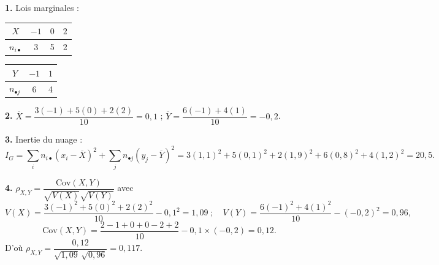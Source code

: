 \documentclass[11pt]{article}
\begin{document}
\textbf{1.} Lois marginales :
\begin{center}\renewcommand{\arraystretch}{1.3}
\begin{tabular}{|c|c|c|c|}\hline $X$ & $-1$ & $0$ & $2$ \\\hline $n_{i\bullet}$ & 3 & 5 & 2 \\\hline\end{tabular}\qquad
\begin{tabular}{|c|c|c|}\hline $Y$ & $-1$ & $1$ \\\hline $n_{\bullet j}$ & 6 & 4 \\\hline\end{tabular}
\end{center}

\textbf{2.} $\overline{X} = \dfrac{3(-1) + 5(0) + 2(2)}{10} = 0{,}1$ ; \quad $\overline{Y} = \dfrac{6(-1) + 4(1)}{10} = -0{,}2$.

\textbf{3.} Inertie du nuage :
\[ I_G = \sum_i n_{i\bullet}(x_i - \overline{X})^2 + \sum_j n_{\bullet j}(y_j - \overline{Y})^2 = 3(1{,}1)^2 + 5(0{,}1)^2 + 2(1{,}9)^2 + 6(0{,}8)^2 + 4(1{,}2)^2 = 20{,}5. \]

\textbf{4.} $\rho_{X,Y} = \dfrac{\mathrm{Cov}(X,Y)}{\sqrt{V(X)}\sqrt{V(Y)}}$ avec
\[ V(X) = \frac{3(-1)^2 + 5(0)^2 + 2(2)^2}{10} - 0{,}1^2 = 1{,}09 \;;\quad V(Y) = \frac{6(-1)^2 + 4(1)^2}{10} - (-0{,}2)^2 = 0{,}96, \]
\[ \mathrm{Cov}(X,Y) = \frac{2 - 1 + 0 + 0 - 2 + 2}{10} - 0{,}1\times(-0{,}2) = 0{,}12. \]
D'où $\rho_{X,Y} = \dfrac{0{,}12}{\sqrt{1{,}09}\,\sqrt{0{,}96}} = 0{,}117$.
\end{document}
